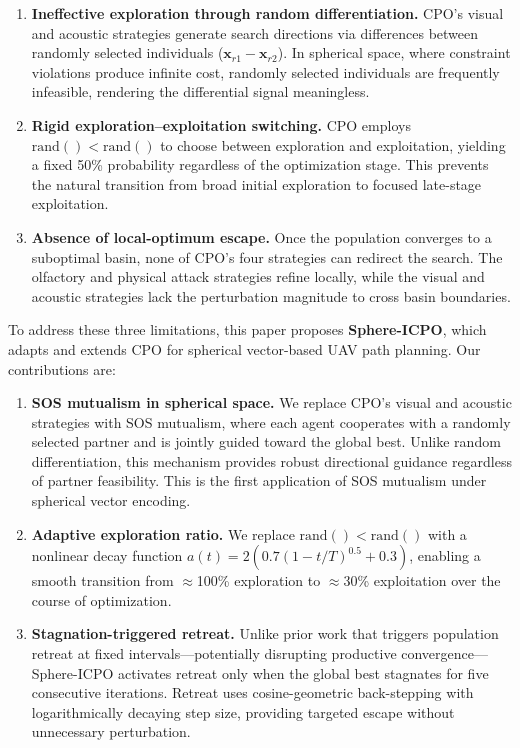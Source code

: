 \documentclass[11pt,a4paper]{article}
\begin{document}
\begin{enumerate}
    \item \textbf{Ineffective exploration through random differentiation.} CPO's visual and acoustic strategies generate search directions via differences between randomly selected individuals ($\mathbf{x}_{r1} - \mathbf{x}_{r2}$). In spherical space, where constraint violations produce infinite cost, randomly selected individuals are frequently infeasible, rendering the differential signal meaningless.

    \item \textbf{Rigid exploration--exploitation switching.} CPO employs $\text{rand}() < \text{rand}()$ to choose between exploration and exploitation, yielding a fixed 50\% probability regardless of the optimization stage. This prevents the natural transition from broad initial exploration to focused late-stage exploitation.

    \item \textbf{Absence of local-optimum escape.} Once the population converges to a suboptimal basin, none of CPO's four strategies can redirect the search. The olfactory and physical attack strategies refine locally, while the visual and acoustic strategies lack the perturbation magnitude to cross basin boundaries.
\end{enumerate}

To address these three limitations, this paper proposes \textbf{Sphere-ICPO}, which adapts and extends CPO for spherical vector-based UAV path planning. Our contributions are:

\begin{enumerate}
    \item \textbf{SOS mutualism in spherical space.} We replace CPO's visual and acoustic strategies with SOS mutualism, where each agent cooperates with a randomly selected partner and is jointly guided toward the global best. Unlike random differentiation, this mechanism provides robust directional guidance regardless of partner feasibility. This is the first application of SOS mutualism under spherical vector encoding.

    \item \textbf{Adaptive exploration ratio.} We replace $\text{rand}() < \text{rand}()$ with a nonlinear decay function $a(t) = 2\left(0.7(1 - t/T)^{0.5} + 0.3\right)$, enabling a smooth transition from $\approx$100\% exploration to $\approx$30\% exploitation over the course of optimization.

    \item \textbf{Stagnation-triggered retreat.} Unlike prior work \cite{icpo2024} that triggers population retreat at fixed intervals---potentially disrupting productive convergence---Sphere-ICPO activates retreat only when the global best stagnates for five consecutive iterations. Retreat uses cosine-geometric back-stepping with logarithmically decaying step size, providing targeted escape without unnecessary perturbation.
\end{enumerate}
\end{document}
